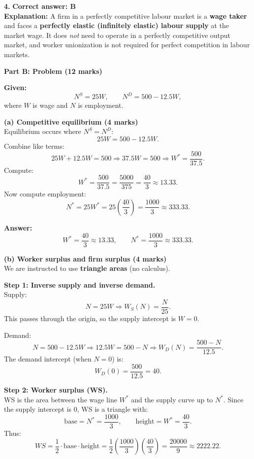 \documentclass[12pt]{article}
\begin{document}
\vspace{0.6em}

\textbf{4.} \textbf{Correct answer: B}\\
\textbf{Explanation:} A firm in a perfectly competitive labour market is a \textbf{wage taker} and faces a \textbf{perfectly elastic (infinitely elastic) labour supply} at the market wage. It does \emph{not} need to operate in a perfectly competitive output market, and worker unionization is not required for perfect competition in labour markets.

\newpage

\textbf{Part B: Problem (12 marks)}

\textbf{Given:}
\[
N^S = 25W,
\qquad
N^D = 500 - 12.5W,
\]
where $W$ is wage and $N$ is employment.

\vspace{0.4em}

\textbf{(a) Competitive equilibrium (4 marks)}\\
Equilibrium occurs where $N^S=N^D$:
\[
25W = 500 - 12.5W.
\]
Combine like terms:
\[
25W + 12.5W = 500
\Rightarrow 37.5W = 500
\Rightarrow W^* = \frac{500}{37.5}.
\]
Compute:
\[
W^* = \frac{500}{37.5} = \frac{5000}{375} = \frac{40}{3}\approx 13.33.
\]
Now compute employment:
\[
N^* = 25W^* = 25\left(\frac{40}{3}\right)=\frac{1000}{3}\approx 333.33.
\]

\vspace{0.6em}

\textbf{Answer:} 
\[
W^*=\frac{40}{3}\approx 13.33,
\qquad
N^*=\frac{1000}{3}\approx 333.33.
\]

\vspace{0.8em}

\textbf{(b) Worker surplus and firm surplus (4 marks)}\\
We are instructed to use \textbf{triangle areas} (no calculus).

\textbf{Step 1: Inverse supply and inverse demand.}\\
Supply:
\[
N=25W \Rightarrow W_S(N)=\frac{N}{25}.
\]
This passes through the origin, so the supply intercept is $W=0$.

Demand:
\[
N=500-12.5W
\Rightarrow 12.5W = 500-N
\Rightarrow W_D(N)=\frac{500-N}{12.5}.
\]
The demand intercept (when $N=0$) is:
\[
W_D(0)=\frac{500}{12.5}=40.
\]

\textbf{Step 2: Worker surplus (WS).}\\
WS is the area between the wage line $W^*$ and the supply curve up to $N^*$.
Since the supply intercept is 0, WS is a triangle with:
\[
\text{base}=N^*=\frac{1000}{3}, 
\qquad
\text{height}=W^*=\frac{40}{3}.
\]
Thus:
\[
WS=\frac{1}{2}\cdot \text{base}\cdot \text{height}
= \frac{1}{2}\left(\frac{1000}{3}\right)\left(\frac{40}{3}\right)
= \frac{20000}{9}
\approx 2222.22.
\]
\end{document}
